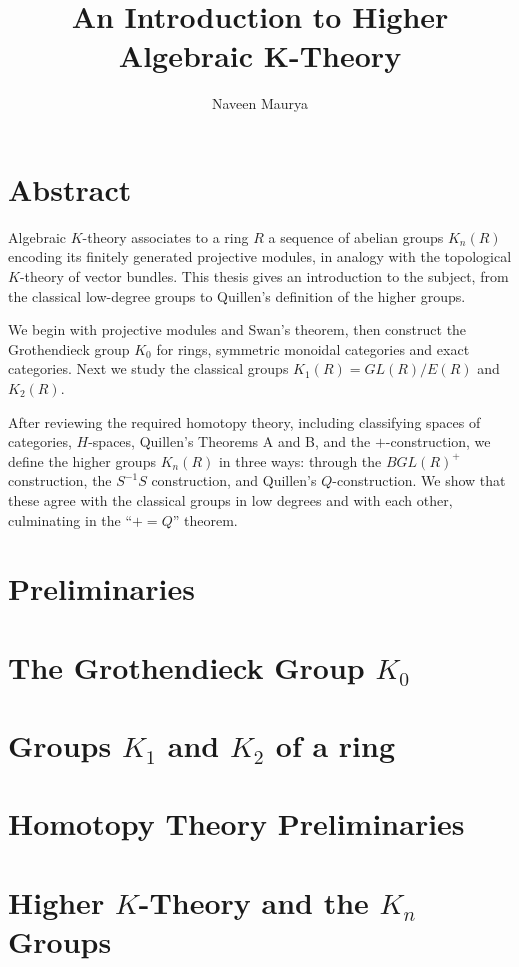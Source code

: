 \documentclass[12pt]{book}
\title{An Introduction to Higher Algebraic K-Theory}
\author{Naveen Maurya}
\theoremstyle{definition}
\newcommand{\0}{\mathbf{0}}
\newcommand{\1}{\mathbf{1}}
\newcommand{\2}{\mathbf{2}}
\begin{document}
\maketitle


\maketitle

\chapter*{Abstract}

Algebraic $K$-theory associates to a ring $R$ a sequence of abelian groups
$K_n(R)$ encoding its finitely generated projective modules, in analogy with
the topological $K$-theory of vector bundles. This thesis gives an
introduction to the subject, from the classical low-degree groups to
Quillen's definition of the higher groups.

We begin with projective modules and Swan's theorem, then construct the
Grothendieck group $K_0$ for rings, symmetric monoidal categories and exact
categories. Next we study the classical groups $K_1(R) = GL(R)/E(R)$ and
$K_2(R)$.

After reviewing the required homotopy theory, including classifying spaces of
categories, $H$-spaces, Quillen's Theorems A and B, and the $+$-construction,
we define the higher groups $K_n(R)$ in three ways: through the
$BGL(R)^+$ construction, the $S^{-1}S$ construction, and Quillen's
$Q$-construction. We show that these agree with the classical groups in low
degrees and with each other, culminating in the ``$+ = Q$'' theorem.

\tableofcontents
\clearpage



\chapter{Preliminaries}


\chapter{The Grothendieck Group $K_0$}


\chapter{Groups $K_1$ and $K_2$ of a ring}


\chapter{Homotopy Theory Preliminaries}


\chapter{Higher $K$-Theory and the $K_n$ Groups} 


\newpage
\printbibliography
\end{document}
